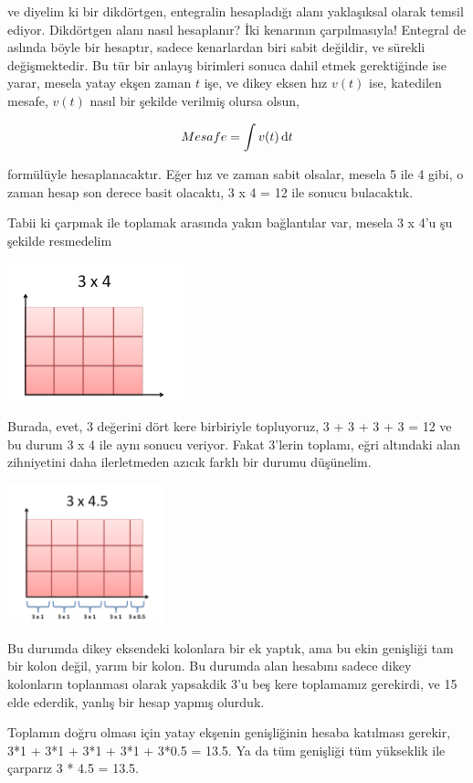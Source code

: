 \documentclass[12pt,fleqn]{article}\usepackage{../../common}
\begin{document}
ve diyelim ki bir dikdörtgen, entegralin hesapladığı alanı yaklaşıksal
olarak temsil ediyor. Dikdörtgen alanı nasıl hesaplanır? İki kenarının
çarpılmasıyla! Entegral de aslında böyle bir hesaptır, sadece kenarlardan
biri sabit değildir, ve sürekli değişmektedir. Bu tür bir anlayış birimleri
sonuca dahil etmek gerektiğinde ise yarar, mesela yatay ekşen zaman $t$
işe, ve dikey eksen hız $v(t)$ ise, katedilen mesafe, $v(t)$ nasıl bir
şekilde verilmiş olursa olsun,

$$ Mesafe = \int v(t) \,\mathrm{d} t $$

formülüyle hesaplanacaktır. Eğer hız ve zaman sabit olsalar, mesela 5 ile 4
gibi, o zaman hesap son derece basit olacaktı, 3 x 4 = 12 ile sonucu
bulacaktık. 

Tabii ki çarpmak ile toplamak arasında yakın bağlantılar var, mesela 3 x
4'u şu şekilde resmedelim

\includegraphics[height=4cm]{ode_mattuck_94_int_04.png}

Burada, evet, 3 değerini dört kere birbiriyle topluyoruz, 3 + 3 + 3 + 3 =
12 ve bu durum 3 x 4 ile aynı sonucu veriyor. Fakat 3'lerin toplamı, eğri
altındaki alan zihniyetini daha ilerletmeden azıcık farklı bir durumu
düşünelim. 

\includegraphics[height=4cm]{ode_mattuck_94_int_09.png}

Bu durumda dikey eksendeki kolonlara bir ek yaptık, ama bu ekin genişliği
tam bir kolon değil, yarım bir kolon. Bu durumda alan hesabını sadece dikey
kolonların toplanması olarak yapsakdik 3'u beş kere toplamamız gerekirdi,
ve 15 elde ederdik, yanlış bir hesap yapmış olurduk.

Toplamın doğru olması için yatay ekşenin genişliğinin hesaba katılması
gerekir, 3*1 + 3*1 + 3*1 + 3*1 + 3*0.5 = 13.5. Ya da tüm genişliği tüm
yükseklik ile çarparız 3 * 4.5 = 13.5. 
\end{document}
